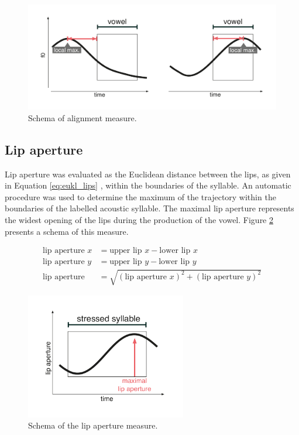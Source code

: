 \begin{figure}[htbp]
\begin{center}
\includegraphics[width=\textwidth]{figures/ch5/measures_alignment.pdf}
\caption{Schema of alignment measure.}
\label{fig:alignment_measure}
\end{center}
\end{figure}

\subsection{Lip aperture}

Lip aperture was evaluated as the Euclidean distance between the lips, as given in Equation \ref{eq:eukl_lips} \citep{Byrd2000}, within the boundaries of the syllable. An automatic procedure was used to determine the maximum of the trajectory within the boundaries of the labelled acoustic syllable. The maximal lip aperture represents the widest opening of the lips during the production of the vowel. Figure \ref{fig:lip_measure} presents a schema of this measure.

\begin{equation}
\begin{split}
\text{lip aperture } x &= \text{upper lip } x - \text{lower lip } x\\
\text{lip aperture } y &= \text{upper lip } y - \text{lower lip } y\\
\text{lip aperture} &= \sqrt{(\text{lip aperture } x)^2+(\text{lip aperture } y)^2}
\end{split}
\label{eq:eukl_lips}
\end{equation}

\begin{figure}[htbp]
\begin{center}
\includegraphics[width=7cm]{figures/ch5/measures_lips.pdf}
\caption{Schema of the lip aperture measure.}
\label{fig:lip_measure}
\end{center}
\end{figure}

